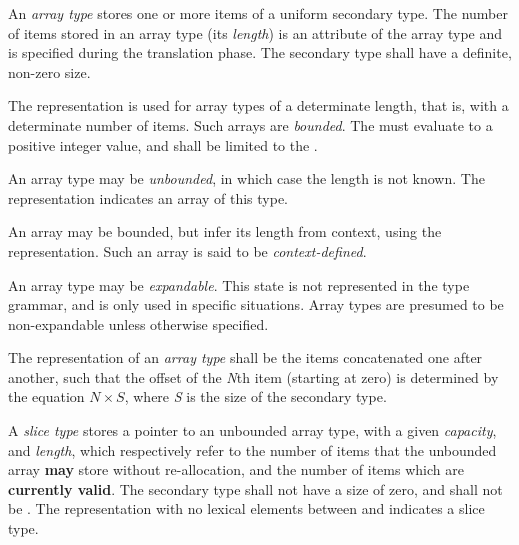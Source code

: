 

\begin{grammar}
 \\
	\terminal{[} \terminal{]}  \\
	\terminal{[}  \terminal{]}  \\
	\terminal{[} \terminal{*} \terminal{]}  \\
	\terminal{[} \terminal{\_} \terminal{]}  \\
\end{grammar}

\specsubsubitem
An \textit{array type} stores one or more items of a uniform secondary type.
The number of items stored in an array type (its \textit{length}) is an
attribute of the array type and is specified during the translation phase. The
secondary type shall have a definite, non-zero size.

\specsubsubitem
The  representation is used for array types of a
determinate length, that is, with a determinate number of items. Such arrays
are \textit{bounded}. The  must evaluate to a positive
integer value, and shall be limited to the .

\specsubsubitem
An array type may be \textit{unbounded}, in which case the length is not known.
The \terminal{*} representation indicates an array of this type.

\specsubsubitem
An array may be bounded, but infer its length from context, using the
\terminal{\_} representation. Such an array is said to be
\textit{context-defined}.

\specsubsubitem
An array type may be \textit{expandable}. This state is not represented in the
type grammar, and is only used in specific situations. Array types are presumed
to be non-expandable unless otherwise specified.

\specsubsubitem
The representation of an \textit{array type} shall be the items concatenated one
after another, such that the offset of the \textit{N}th item (starting at zero)
is determined by the equation $N \times S$, where \textit{S} is the size of the
secondary type.

\specsubsubitem
A \textit{slice type} stores a pointer to an unbounded array type, with a given
\textit{capacity}, and \textit{length}, which respectively refer to the number
of items that the unbounded array \textbf{may} store without re-allocation, and
the number of items which are \textbf{currently valid}. The secondary type shall
not have a size of zero, and shall not be . The representation
with no lexical elements between \terminal{[} and \terminal{]} indicates a slice
type.

